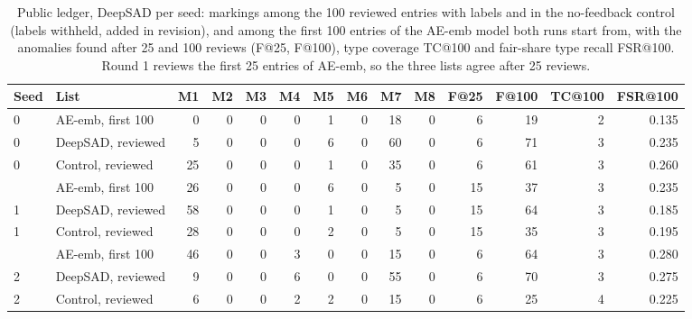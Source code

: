\begin{table}[htbp]
\caption{Public ledger, DeepSAD per seed: markings among the 100 reviewed entries with labels and in the no-feedback control (labels withheld, added in revision), and among the first 100 entries of the AE-emb model both runs start from, with the anomalies found after 25 and 100 reviews (F@25, F@100), type coverage TC@100 and fair-share type recall FSR@100. Round 1 reviews the first 25 entries of AE-emb, so the three lists agree after 25 reviews.}
\label{tab:app-deepsad-seeds}
\centering
\scriptsize
\setlength{\tabcolsep}{3pt}
\begin{tabular}{@{}llrrrrrrrrrrrr@{}}
\toprule
Seed & List & M1 & M2 & M3 & M4 & M5 & M6 & M7 & M8 & F@25 & F@100 & TC@100 & FSR@100 \\
\midrule
0 & AE-emb, first 100 & 0 & 0 & 0 & 0 & 1 & 0 & 18 & 0 & 6 & 19 & 2 & 0.135 \\
0 & DeepSAD, reviewed & 5 & 0 & 0 & 0 & 6 & 0 & 60 & 0 & 6 & 71 & 3 & 0.235 \\
0 & Control, reviewed & 25 & 0 & 0 & 0 & 1 & 0 & 35 & 0 & 6 & 61 & 3 & 0.260 \\
\addlinespace
1 & AE-emb, first 100 & 26 & 0 & 0 & 0 & 6 & 0 & 5 & 0 & 15 & 37 & 3 & 0.235 \\
1 & DeepSAD, reviewed & 58 & 0 & 0 & 0 & 1 & 0 & 5 & 0 & 15 & 64 & 3 & 0.185 \\
1 & Control, reviewed & 28 & 0 & 0 & 0 & 2 & 0 & 5 & 0 & 15 & 35 & 3 & 0.195 \\
\addlinespace
2 & AE-emb, first 100 & 46 & 0 & 0 & 3 & 0 & 0 & 15 & 0 & 6 & 64 & 3 & 0.280 \\
2 & DeepSAD, reviewed & 9 & 0 & 0 & 6 & 0 & 0 & 55 & 0 & 6 & 70 & 3 & 0.275 \\
2 & Control, reviewed & 6 & 0 & 0 & 2 & 2 & 0 & 15 & 0 & 6 & 25 & 4 & 0.225 \\
\bottomrule
\end{tabular}
\end{table}
